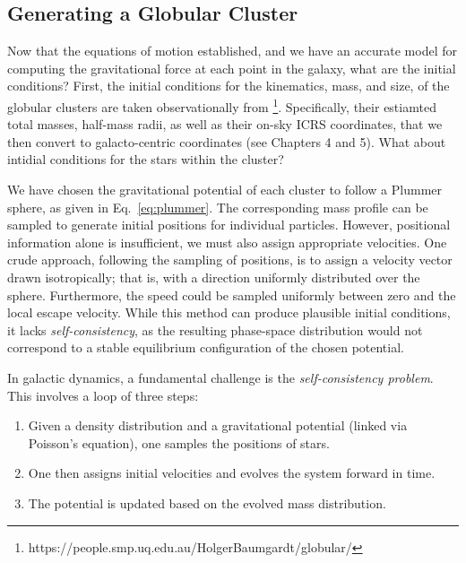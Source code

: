     \subsection{Generating a Globular Cluster}\label{subsec:initialconditions}
        Now that the equations of motion established, and we have an accurate model for computing the gravitational force at each point in the galaxy, what are the initial conditions? First, the initial conditions for the kinematics, mass, and size, of the globular clusters are taken observationally from \citet{2018MNRAS.478.1520B} \citep[this catalog was assembled across a series of works, see also][]{2017MNRAS.464.2174B,2019MNRAS.482.5138B,2020PASA...37...46B,2021MNRAS.505.5957B}\footnote{https://people.smp.uq.edu.au/HolgerBaumgardt/globular/}. Specifically, their estiamted total masses, half-mass radii, as well as their on-sky ICRS coordinates, that we then convert to galacto-centric coordinates (see Chapters 4 and 5). What about intidial conditions for the stars within the cluster? 

        We have chosen the gravitational potential of each cluster to follow a Plummer sphere, as given in Eq.~\ref{eq:plummer}. The corresponding mass profile can be sampled to generate initial positions for individual particles. However, positional information alone is insufficient, we must also assign appropriate velocities. One crude approach, following the sampling of positions, is to assign a velocity vector drawn isotropically; that is, with a direction uniformly distributed over the sphere. Furthermore, the speed could be sampled uniformly between zero and the local escape velocity. While this method can produce plausible initial conditions, it lacks \textit{self-consistency}, as the resulting phase-space distribution would not correspond to a stable equilibrium configuration of the chosen potential.

        In galactic dynamics, a fundamental challenge is the \textit{self-consistency problem}. This involves a loop of three steps:  
        \begin{enumerate}
            \item Given a density distribution and a gravitational potential (linked via Poisson's equation), one samples the positions of stars.  
            \item One then assigns initial velocities and evolves the system forward in time.  
            \item The potential is updated based on the evolved mass distribution.
        \end{enumerate}


